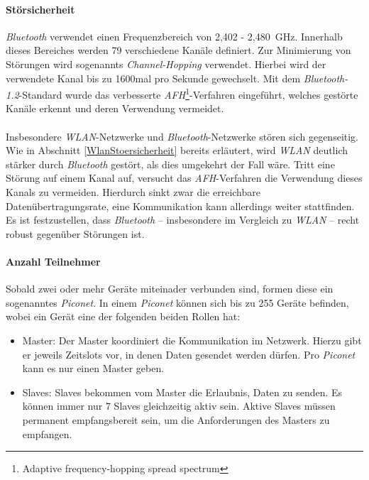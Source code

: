             \paragraph{Störsicherheit}
                \emph{Bluetooth} verwendet einen Frequenzbereich von 2,402 - 2,480~GHz. Innerhalb
                dieses Bereiches werden 79 verschiedene Kanäle definiert. Zur Minimierung
                von Störungen wird sogenannts \textsl{Channel-Hopping} verwendet. Hierbei
                wird der verwendete Kanal bis zu 1600mal pro Sekunde gewechselt. Mit dem
                \emph{Bluetooth-1.2}-Standard wurde das verbesserte  
                \emph{AFH}\footnote{Adaptive frequency-hopping spread spectrum}-Verfahren 
                eingeführt, welches gestörte Kanäle erkennt und deren Verwendung
                vermeidet.\\
                \\
                Insbesondere \emph{WLAN}-Netzwerke und \emph{Bluetooth}-Netzwerke stören sich 
                gegenseitig. Wie in Abschnitt \ref{WlanStoersicherheit} bereits
                erläutert, wird \emph{WLAN} deutlich stärker durch \emph{Bluetooth} gestört,
                als dies umgekehrt der Fall wäre. Tritt eine Störung auf einem
                Kanal auf, versucht das \emph{AFH}-Verfahren die Verwendung dieses
                Kanals zu vermeiden. Hierdurch sinkt zwar die erreichbare
                Datenübertragungsrate, eine Kommunikation kann allerdings weiter 
                stattfinden.
                 \\
                 Es ist festzustellen, dass \emph{Bluetooth} -- insbesondere im Vergleich
                 zu \emph{WLAN} -- recht robust gegenüber Störungen ist.

            \paragraph{Anzahl Teilnehmer}
                Sobald zwei oder mehr Geräte miteinader verbunden sind, formen diese ein
                sogenanntes \emph{Piconet}. In einem \emph{Piconet} können sich bis
                zu 255 Geräte befinden, wobei ein Gerät eine der folgenden beiden Rollen
                hat:

                \begin{itemize}
                    \item{Master:} Der Master koordiniert die Kommunikation im Netzwerk.
                                   Hierzu gibt er jeweils Zeitslots vor, in denen
                                   Daten gesendet werden dürfen. Pro \emph{Piconet} kann
                                   es nur einen Master geben.
                    \item{Slaves:} Slaves bekommen vom Master die Erlaubnis, Daten zu senden.
                                   Es können immer nur 7 Slaves gleichzeitig aktiv sein.
                                   Aktive Slaves müssen permanent empfangsbereit sein,
                                   um die Anforderungen des Masters zu empfangen. 
                \end{itemize}

